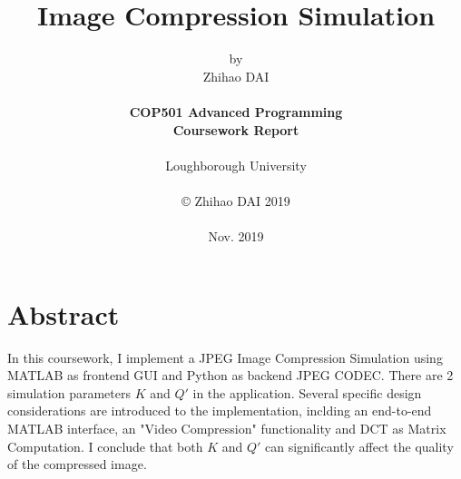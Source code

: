 \title{\bf Image Compression Simulation}

\author{by\\Zhihao DAI\\
\\
{\bf COP501 Advanced Programming}\\
{\bf Coursework Report}\\
\\
Loughborough University\\
\\
\copyright
\hspace{1 dd} Zhihao DAI 2019\\
\\
Nov. 2019
}
\date{} %

\maketitle


% 
% 

\chapter*{Abstract}
In this coursework, I implement a JPEG Image Compression Simulation using MATLAB as frontend GUI and Python as backend JPEG CODEC. There are 2 simulation parameters $K$ and $Q'$ in the application. 
Several specific design considerations are introduced to the implementation, inclding an end-to-end MATLAB interface, an "Video Compression" functionality and DCT as Matrix Computation.
I conclude that both $K$ and $Q'$ can significantly affect the quality of the compressed image.



